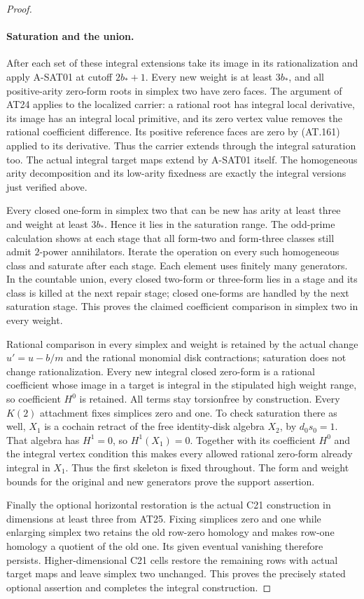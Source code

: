 \begin{proof}
\paragraph{Saturation and the union.}
After each set of these integral extensions take its image
in its rationalization and apply A-SAT01 at cutoff
$2b_*+1$. Every new weight is at least $3b_*$, and all
positive-arity zero-form roots in simplex two have zero
faces. The argument of AT24 applies to the localized carrier:
a rational root has integral local derivative, its image has
an integral local primitive, and its zero vertex value removes
the rational coefficient difference. Its positive reference
faces are zero by (AT.161) applied to its derivative.
Thus the carrier extends through the integral saturation too.
The actual integral target maps extend by A-SAT01 itself.
The homogeneous arity decomposition and its low-arity fixedness
are exactly the integral versions just verified above.

Every closed one-form in simplex two that can be new has arity
at least three and weight at least $3b_*$. Hence it lies in
the saturation range. The odd-prime calculation shows at each
stage that all form-two and form-three classes still admit
$2$-power annihilators. Iterate the operation on every such
homogeneous class and saturate after each stage. Each element
uses finitely many generators. In the countable union, every
closed two-form or three-form lies in a stage and its class
is killed at the next repair stage; closed one-forms are
handled by the next saturation stage. This proves the claimed
coefficient comparison in simplex two in every weight.

Rational comparison in every simplex and weight is retained
by the actual change $u'=u-b/m$ and the rational monomial
disk contractions; saturation does not change rationalization.
Every new integral closed zero-form is a rational coefficient
whose image in a target is integral in the stipulated high
weight range, so coefficient $H^0$ is retained. All terms stay
torsionfree by construction. Every $K(2)$ attachment fixes
simplices zero and one. To check saturation there as well,
$X_1$ is a cochain retract of the free identity-disk algebra
$X_2$, by $d_0s_0=1$. That algebra has $H^1=0$, so
$H^1(X_1)=0$. Together with its coefficient $H^0$ and the
integral vertex condition this makes every allowed rational
zero-form already integral in $X_1$. Thus the first skeleton
is fixed throughout. The form and weight bounds for the
original and new generators prove the support assertion.

Finally the optional horizontal restoration is the actual
C21 construction in dimensions at least three from AT25.
Fixing simplices zero and one while enlarging simplex two
retains the old row-zero homology and makes row-one homology
a quotient of the old one. Its given eventual vanishing
therefore persists. Higher-dimensional C21 cells restore the
remaining rows with actual target maps and leave simplex two
unchanged. This proves the precisely stated optional assertion
and completes the integral construction.
\end{proof}

